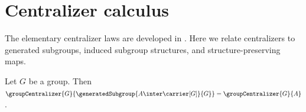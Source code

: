 




\section{Centralizer calculus}

The elementary centralizer laws are developed in
.  Here we relate centralizers to generated
subgroups, induced subgroup structures, and structure-preserving maps.

\begin{theorem}\label{group_centralizer_generated_subgroup_trace}
    Let $G$ be a group.
    Then
        $\groupCentralizer{G}{
            \generatedSubgroup{A\inter\carrier[G]}{G}}=
         \groupCentralizer{G}{A}$.
\end{theorem}
